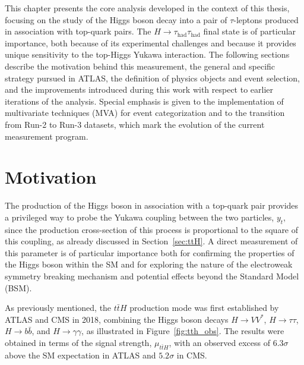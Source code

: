 \newcommand*{\pth}{$p^{H}_{\text{T}}$\xspace}
\newcommand*{\htautau}{$H \to \tau \tau$\xspace}
\newcommand*{\ztautau}{$Z \to \tau \tau$\xspace}
\newcommand*{\pt}{$p_{\text{T}}$\xspace}
\newcommand*{\taul}{$\tau$-lepton\xspace}
\newcommand*{\tauhadvis}{\ensuremath{\tauhad}\xspace}
\newcommand*{\mmc}{\ensuremath{m^\text{MMC}_{\tau\tau}}\xspace}
\newcommand*{\taulephad}{$\tau_{\text{lep}}\tau_{\text{had}}$\xspace}
\newcommand*{\tauhadhad}{$\tau_{\text{had}}\tau_{\text{had}}$\xspace}



This chapter presents the core analysis developed in the context of this thesis, focusing on the study of the Higgs boson decay into a pair of $\tau$-leptons produced in association with top-quark pairs. The \( H \to \tau_{\text{had}}\tau_{\text{had}}\) final state is of particular importance, both because of its experimental challenges and because it provides unique sensitivity to the top-Higgs Yukawa interaction. The following sections describe the motivation behind this measurement, the general and specific strategy pursued in ATLAS, the definition of physics objects and event selection, and the improvements introduced during this work with respect to earlier iterations of the analysis. Special emphasis is given to the implementation of multivariate techniques (MVA) for event categorization and to the transition from Run-2 to Run-3 datasets, which mark the evolution of the current measurement program.


\section{Motivation}
\label{sec:analysis_motivation}

The production of the Higgs boson in association with a top-quark pair provides a privileged way to probe the Yukawa coupling between the two particles, $y_{t}$, since the production cross-section of this process is proportional to the square of this coupling, as already discussed in Section~\ref{sec:ttH}. A direct measurement of this parameter is of particular importance both for confirming the properties of the Higgs boson within the SM and for exploring the nature of the electroweak symmetry breaking mechanism and potential effects beyond the Standard Model (BSM).

As previously mentioned, the $t\bar{t}H$ production mode was first established by ATLAS and CMS in 2018, combining the Higgs boson decays $H \to VV^{*}$, $H \to \tau\tau$, $H \to b\bar{b}$, and $H \to \gamma\gamma$, as illustrated in Figure~\ref{fig:tth_obs}. The results were obtained in terms of the signal strength, $\mu_{t\bar{t}H}$, with an observed excess of $6.3\sigma$ above the SM expectation in ATLAS and $5.2\sigma$ in CMS.

